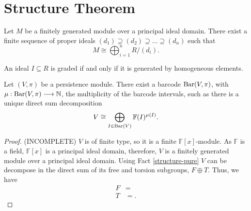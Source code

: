 \begin{definition}
    
\end{definition}

\begin{definition} \label{delta-matching}
    
\end{definition}

\begin{definition}
    
\end{definition}

\begin{definition}
    
\end{definition}

\newpage
\section{Structure Theorem}
\begin{fact} \label{structure-pure}
    Let $ M $ be a  finitely generated module over a principal ideal domain. There exist a finite sequence of proper ideals $ (d_1) \supseteq (d_2) \supseteq \dots \supseteq (d_n) $ such that
    $$
        M \cong \bigoplus_{i=1}^n R / (d_i).
    $$

\end{fact}

\begin{proposition}
    An ideal $ I \subseteq R $ is graded if and only if it is generated by homogeneous elements.
\end{proposition}

\begin{theorem}[Structure] \label{structure}
    Let $ (V, \pi) $ be a persistence module. There exist a barcode $ \operatorname{Bar}(V, \pi) $, with $ \mu : \operatorname{Bar} (V, \pi) \longrightarrow \mathbb N $, the multiplicity of the barcode intervals, such as there is a unique direct sum decomposition
    $$
        V \cong \bigoplus_{I \in  \operatorname{Bar} (V)} \mathbb F (I)^{\mu (I)}.
    $$
\end{theorem}
\begin{proof}
    (INCOMPLETE)
    $ V $ is of finite type, so it is a finite $ \mathbb F[x] $-module. As $ \mathbb F $ is a field, $ \mathbb F[x] $ is a principal ideal domain, therefore, $ V $ is a finitely generated module over a principal ideal domain. Using Fact \ref{structure-pure} $ V $ can be decompose in the direct sum of its free and torsion subgroups, $ F \oplus T $. Thus, we have
    \begin{align*}
        F &= \\
        T &= .
    \end{align*}
    
\end{proof}

